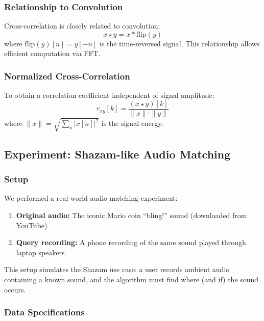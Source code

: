 \documentclass[12pt,a4paper]{article}
\begin{document}
\subsubsection{Relationship to Convolution}

Cross-correlation is closely related to convolution:
\begin{equation}
    x \star y = x * \text{flip}(y)
\end{equation}
where $\text{flip}(y)[n] = y[-n]$ is the time-reversed signal. This relationship allows efficient computation via FFT.

\subsubsection{Normalized Cross-Correlation}

To obtain a correlation coefficient independent of signal amplitude:
\begin{equation}
    r_{xy}[k] = \frac{(x \star y)[k]}{\|x\| \cdot \|y\|}
\end{equation}
where $\|x\| = \sqrt{\sum_n |x[n]|^2}$ is the signal energy.

\subsection{Experiment: Shazam-like Audio Matching}

\subsubsection{Setup}

We performed a real-world audio matching experiment:

\begin{enumerate}
    \item \textbf{Original audio:} The iconic Mario coin ``bling!'' sound (downloaded from YouTube)
    \item \textbf{Query recording:} A phone recording of the same sound played through laptop speakers
\end{enumerate}

This setup simulates the Shazam use case: a user records ambient audio containing a known sound, and the algorithm must find where (and if) the sound occurs.

\subsubsection{Data Specifications}
\end{document}

